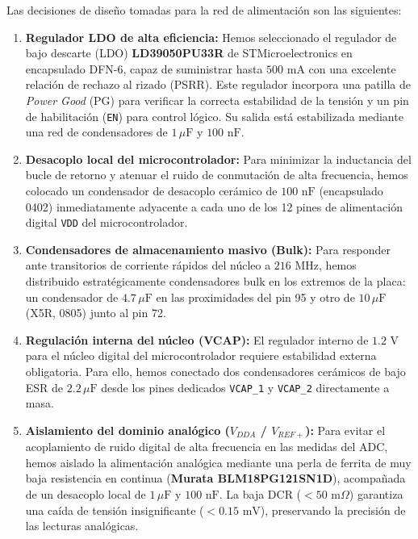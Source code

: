 \documentclass[12pt,a4paper]{article}
\begin{document}
Las decisiones de diseño tomadas para la red de alimentación son las siguientes:
\begin{enumerate}
    \item \textbf{Regulador LDO de alta eficiencia:} Hemos seleccionado el regulador de bajo descarte (LDO) \textbf{LD39050PU33R} de STMicroelectronics en encapsulado DFN-6, capaz de suministrar hasta $500\text{ mA}$ con una excelente relación de rechazo al rizado (PSRR). Este regulador incorpora una patilla de \textit{Power Good} (PG) para verificar la correcta estabilidad de la tensión y un pin de habilitación (\texttt{EN}) para control lógico. Su salida está estabilizada mediante una red de condensadores de $1\,\mu\text{F}$ y $100\text{ nF}$.
    \item \textbf{Desacoplo local del microcontrolador:} Para minimizar la inductancia del bucle de retorno y atenuar el ruido de conmutación de alta frecuencia, hemos colocado un condensador de desacoplo cerámico de $100\text{ nF}$ (encapsulado 0402) inmediatamente adyacente a cada uno de los 12 pines de alimentación digital \texttt{VDD} del microcontrolador.
    \item \textbf{Condensadores de almacenamiento masivo (Bulk):} Para responder ante transitorios de corriente rápidos del núcleo a $216\text{ MHz}$, hemos distribuido estratégicamente condensadores bulk en los extremos de la placa: un condensador de $4.7\,\mu\text{F}$ en las proximidades del pin 95 y otro de $10\,\mu\text{F}$ (X5R, 0805) junto al pin 72.
    \item \textbf{Regulación interna del núcleo (VCAP):} El regulador interno de $1.2\text{ V}$ para el núcleo digital del microcontrolador requiere estabilidad externa obligatoria. Para ello, hemos conectado dos condensadores cerámicos de bajo ESR de $2.2\,\mu\text{F}$ desde los pines dedicados \texttt{VCAP\_1} y \texttt{VCAP\_2} directamente a masa.
    \item \textbf{Aislamiento del dominio analógico ($V_{DDA}$ / $V_{REF+}$):} Para evitar el acoplamiento de ruido digital de alta frecuencia en las medidas del ADC, hemos aislado la alimentación analógica mediante una perla de ferrita de muy baja resistencia en continua (\textbf{Murata BLM18PG121SN1D}), acompañada de un desacoplo local de $1\,\mu\text{F}$ y $100\text{ nF}$. La baja DCR ($< 50\text{ m}\Omega$) garantiza una caída de tensión insignificante ($< 0.15\text{ mV}$), preservando la precisión de las lecturas analógicas.
\end{enumerate}
\end{document}
